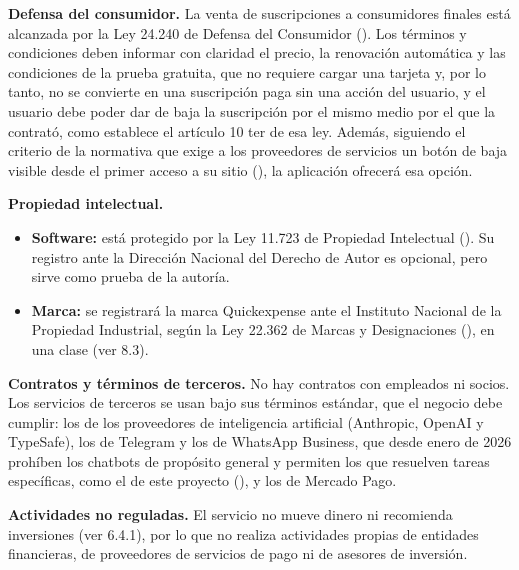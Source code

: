 \textbf{Defensa del consumidor.} La venta de suscripciones a
consumidores finales está alcanzada por la Ley 24.240 de Defensa del
Consumidor (). Los términos y condiciones deben informar con claridad el
precio, la renovación automática y las condiciones de la prueba
gratuita, que no requiere cargar una tarjeta y, por lo tanto, no se
convierte en una suscripción paga sin una acción del usuario, y el
usuario debe poder dar de baja la suscripción por el mismo medio por el
que la contrató, como establece el artículo 10 ter de esa ley. Además,
siguiendo el criterio de la normativa que exige a los proveedores de
servicios un botón de baja visible desde el primer acceso a su sitio
(), la aplicación
ofrecerá esa opción.

\textbf{Propiedad intelectual.}

\begin{itemize}
\tightlist
\item
  \textbf{Software:} está protegido por la Ley 11.723 de Propiedad
  Intelectual (). Su registro ante la Dirección
  Nacional del Derecho de Autor es opcional, pero sirve como prueba de
  la autoría.
\item
  \textbf{Marca:} se registrará la marca Quickexpense ante el Instituto
  Nacional de la Propiedad Industrial, según la Ley 22.362 de Marcas y
  Designaciones (), en una clase (ver 8.3).
\end{itemize}

\textbf{Contratos y términos de terceros.} No hay contratos con
empleados ni socios. Los servicios de terceros se usan bajo sus términos
estándar, que el negocio debe cumplir: los de los proveedores de
inteligencia artificial (Anthropic, OpenAI y TypeSafe), los de Telegram
y los de WhatsApp Business, que desde enero de 2026 prohíben los
chatbots de propósito general y permiten los que resuelven tareas
específicas, como el de este proyecto
(), y los de Mercado Pago.

\textbf{Actividades no reguladas.} El servicio no mueve dinero ni
recomienda inversiones (ver 6.4.1), por lo que no realiza actividades
propias de entidades financieras, de proveedores de servicios de pago ni
de asesores de inversión.

